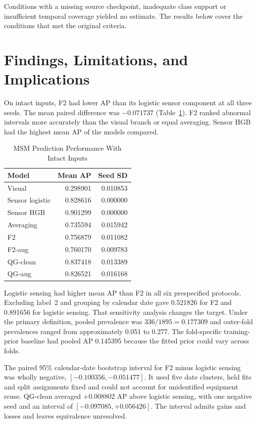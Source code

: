 Conditions with a missing source checkpoint, inadequate class support or insufficient
temporal coverage yielded no estimate. The results below cover the conditions that met
the original criteria.

\section{Findings, Limitations, and Implications}
On intact inputs, F2 had lower AP than its logistic sensor component at all three seeds.
The mean paired difference was $-0.071737$ (Table~\ref{tab:msm-clean}). F2 ranked
abnormal intervals more accurately than the visual branch or equal averaging. Sensor HGB
had the highest mean AP of the models compared.

\begin{table}[htbp]
\caption{MSM Prediction Performance With Intact Inputs}\label{tab:msm-clean}
\centering\small

\begin{tabular}{lrr}\hline Model&Mean AP&Seed SD\\\hline
Visual&0.298901&0.010853\\
Sensor logistic&0.828616&0.000000\\
Sensor HGB&0.901299&0.000000\\
Averaging&0.735594&0.015942\\
F2&0.756879&0.011082\\
F2-aug&0.760170&0.009783\\
QG-clean&0.837418&0.013389\\
QG-aug&0.826521&0.016168\\\hline
\end{tabular}
\end{table}

Logistic sensing had higher mean AP than F2 in all six prespecified protocols. Excluding
label~2 and grouping by calendar date gave 0.521826 for F2 and 0.891656 for logistic
sensing. That sensitivity analysis changes the target. Under the primary definition,
pooled prevalence was $336/1895=0.177309$ and outer-fold prevalences ranged from
approximately 0.051 to 0.277. The fold-specific training-prior baseline had pooled AP
0.145395 because the fitted prior could vary across folds.

The paired 95\% calendar-date bootstrap interval for F2 minus logistic sensing was
wholly negative, $[-0.100356,-0.051477]$. It used five date clusters, held fits and
split assignments fixed and could not account for unidentified equipment reuse. QG-clean
averaged $+0.008802$ AP above logistic sensing, with one negative seed and an interval
of $[-0.097085,+0.056426]$. The interval admits gains and losses and leaves equivalence
unresolved.

